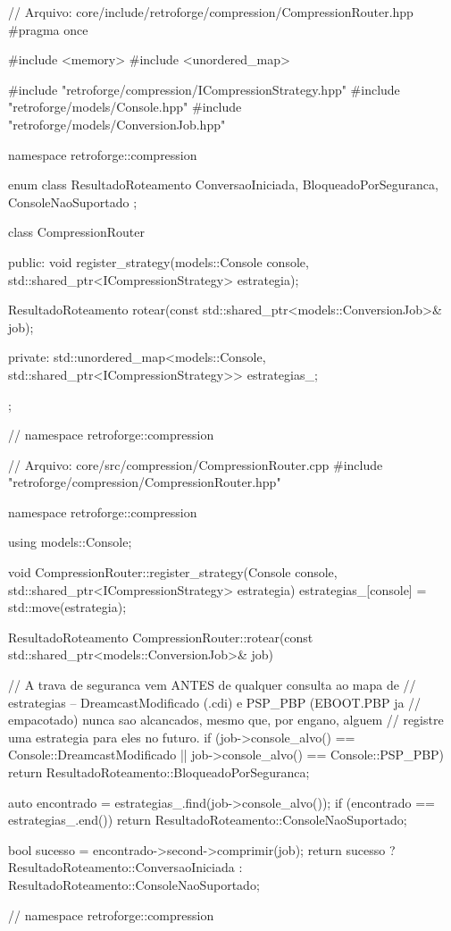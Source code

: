 \begin{CaixaCodigo}
// Arquivo: core/include/retroforge/compression/CompressionRouter.hpp
#pragma once

#include <memory>
#include <unordered_map>

#include "retroforge/compression/ICompressionStrategy.hpp"
#include "retroforge/models/Console.hpp"
#include "retroforge/models/ConversionJob.hpp"

namespace retroforge::compression {

enum class ResultadoRoteamento {
    ConversaoIniciada,
    BloqueadoPorSeguranca,
    ConsoleNaoSuportado
};

class CompressionRouter {
public:
    void register_strategy(models::Console console,
                            std::shared_ptr<ICompressionStrategy> estrategia);

    ResultadoRoteamento rotear(const std::shared_ptr<models::ConversionJob>& job);

private:
    std::unordered_map<models::Console, std::shared_ptr<ICompressionStrategy>>
        estrategias_;
};

} // namespace retroforge::compression
\end{CaixaCodigo}

\begin{CaixaCodigo}
// Arquivo: core/src/compression/CompressionRouter.cpp
#include "retroforge/compression/CompressionRouter.hpp"

namespace retroforge::compression {

using models::Console;

void CompressionRouter::register_strategy(Console console,
                                           std::shared_ptr<ICompressionStrategy> estrategia) {
    estrategias_[console] = std::move(estrategia);
}

ResultadoRoteamento CompressionRouter::rotear(const std::shared_ptr<models::ConversionJob>& job) {
    // A trava de seguranca vem ANTES de qualquer consulta ao mapa de
    // estrategias -- DreamcastModificado (.cdi) e PSP_PBP (EBOOT.PBP ja
    // empacotado) nunca sao alcancados, mesmo que, por engano, alguem
    // registre uma estrategia para eles no futuro.
    if (job->console_alvo() == Console::DreamcastModificado ||
        job->console_alvo() == Console::PSP_PBP) {
        return ResultadoRoteamento::BloqueadoPorSeguranca;
    }

    auto encontrado = estrategias_.find(job->console_alvo());
    if (encontrado == estrategias_.end()) {
        return ResultadoRoteamento::ConsoleNaoSuportado;
    }

    bool sucesso = encontrado->second->comprimir(job);
    return sucesso ? ResultadoRoteamento::ConversaoIniciada
                    : ResultadoRoteamento::ConsoleNaoSuportado;
}

} // namespace retroforge::compression
\end{CaixaCodigo}

